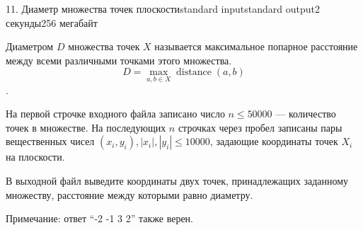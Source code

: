 \begin{problem}{11. Диаметр множества точек плоскости}{standard input}{standard output}{2 секунды}{256 мегабайт}

Диаметром $D$ множества точек $X$ называется максимальное попарное расстояние между всеми различными точками этого множества.
$$ D = \max\limits_{a, b \in X} \operatorname{distance}(a, b) $$.

\InputFile

На первой строчке входного файла записано число $n \le 50000$ — количество точек в множестве. На последующих $n$ строчках через пробел записаны пары вещественных чисел $(x_i, y_i), |x_i| , |y_i| \le 10000$, задающие координаты точек $X_i$ на плоскости.

\OutputFile
В выходной файл выведите координаты двух точек, принадлежащих заданному множеству, расстояние между которыми равно диаметру.

\Examples

\begin{example}%
%
\end{example}

\begin{example}
%
\end{example}

Примечание: ответ “-2 -1 3 2” также верен.

\end{problem}
